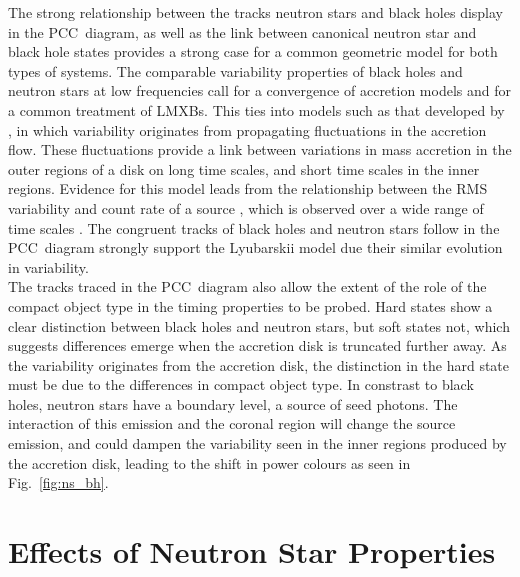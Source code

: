 The strong relationship between the tracks neutron stars and black holes display in the \ac{PCC}~diagram, as well as the link between canonical neutron star and black hole states provides a strong case for a common geometric model for both types of systems. The comparable variability properties of black holes and neutron stars at low frequencies call for a convergence of accretion models and for a common treatment of \acp{LMXB}. This ties into models such as that developed by \citet{lyubarskii1997flicker}, in which variability originates from propagating fluctuations in the accretion flow. These fluctuations provide a link between variations in mass accretion in the outer regions of a disk on long time scales, and short time scales in the inner regions. Evidence for this model leads from the relationship between the \ac{RMS} variability and count rate of a source \citep{uttley2001flux,heil2012ubiquity}, which is observed over a wide range of time scales \citep{gleissner2004long}. The congruent tracks of black holes and neutron stars follow in the \ac{PCC}~diagram strongly support the Lyubarskii model due their similar evolution in variability.\\

The tracks traced in the \ac{PCC}~diagram also allow the extent of the role of the compact object type in the timing properties to be probed. Hard states show a clear distinction between black holes and neutron stars, but soft states not, which suggests differences emerge when the accretion disk is truncated further away. As the variability originates from the accretion disk, the distinction in the hard state must be due to the differences in compact object type. In constrast to black holes, neutron stars have a boundary level, a source of seed photons. The interaction of this emission and the coronal region will change the source emission, and could dampen the variability seen in the inner regions produced by the accretion disk, leading to the shift in power colours as seen in Fig.~\ref{fig:ns_bh}.

\section{Effects of Neutron Star Properties}

